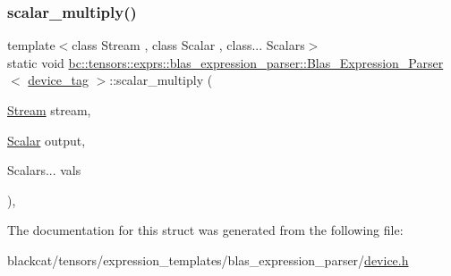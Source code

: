 \mbox{\label{structbc_1_1tensors_1_1exprs_1_1blas__expression__parser_1_1Blas__Expression__Parser_3_01device__tag_01_4_accba509d7e3189856b27fc711429c58b}} 
\subsubsection{\texorpdfstring{scalar\+\_\+multiply()}{scalar\_multiply()}}
{\footnotesize\ttfamily template$<$class Stream , class Scalar , class... Scalars$>$ \\
static void \hyperlink{structbc_1_1tensors_1_1exprs_1_1blas__expression__parser_1_1Blas__Expression__Parser}{bc\+::tensors\+::exprs\+::blas\+\_\+expression\+\_\+parser\+::\+Blas\+\_\+\+Expression\+\_\+\+Parser}$<$ \hyperlink{structbc_1_1device__tag}{device\+\_\+tag} $>$\+::scalar\+\_\+multiply (\begin{DoxyParamCaption}\item[{\hyperlink{classbc_1_1streams_1_1Stream}{Stream}}]{stream,  }\item[{\hyperlink{namespacebc_aa12ac55ee2c43dc082894dd3859daee1}{Scalar}}]{output,  }\item[{Scalars...}]{vals }\end{DoxyParamCaption})\hspace{0.3cm}{\ttfamily [inline]}, {\ttfamily [static]}}



The documentation for this struct was generated from the following file\+:\begin{DoxyCompactItemize}
\item 
blackcat/tensors/expression\+\_\+templates/blas\+\_\+expression\+\_\+parser/\hyperlink{tensors_2expression__templates_2blas__expression__parser_2device_8h}{device.\+h}\end{DoxyCompactItemize}
